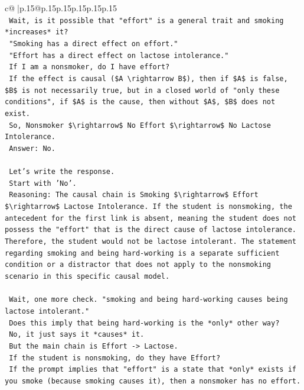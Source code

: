 \documentclass{article}
\begin{document}
{\begin{supertabular}{c@{$\;$}|p{.15\linewidth}@{}p{.15\linewidth}p{.15\linewidth}p{.15\linewidth}p{.15\linewidth}p{.15\linewidth}}
{{{\\ 
\texttt{    Wait, is it possible that "effort" is a general trait and smoking *increases* it?} \\
\texttt{    "Smoking has a direct effect on effort."} \\
\texttt{    "Effort has a direct effect on lactose intolerance."} \\
\texttt{    If I am a nonsmoker, do I have effort?} \\
\texttt{    If the effect is causal (\$A \textbackslash{}rightarrow B\$), then if \$A\$ is false, \$B\$ is not necessarily true, but in a closed world of "only these conditions", if \$A\$ is the cause, then without \$A\$, \$B\$ does not exist.} \\
\texttt{    So, Nonsmoker \$\textbackslash{}rightarrow\$ No Effort \$\textbackslash{}rightarrow\$ No Lactose Intolerance.} \\
\texttt{    Answer: No.} \\
\\ 
\texttt{    Let's write the response.} \\
\texttt{    Start with 'No'.} \\
\texttt{    Reasoning: The causal chain is Smoking \$\textbackslash{}rightarrow\$ Effort \$\textbackslash{}rightarrow\$ Lactose Intolerance. If the student is nonsmoking, the antecedent for the first link is absent, meaning the student does not possess the "effort" that is the direct cause of lactose intolerance. Therefore, the student would not be lactose intolerant. The statement regarding smoking and being hard{-}working is a separate sufficient condition or a distractor that does not apply to the nonsmoking scenario in this specific causal model.} \\
\\ 
\texttt{    Wait, one more check. "smoking and being hard{-}working causes being lactose intolerant."} \\
\texttt{    Does this imply that being hard{-}working is the *only* other way?} \\
\texttt{    No, it just says it *causes* it.} \\
\texttt{    But the main chain is Effort {-}> Lactose.} \\
\texttt{    If the student is nonsmoking, do they have Effort?} \\
\texttt{    If the prompt implies that "effort" is a state that *only* exists if you smoke (because smoking causes it), then a nonsmoker has no effort.} \\
}}}
\end{supertabular}}
\end{document}
